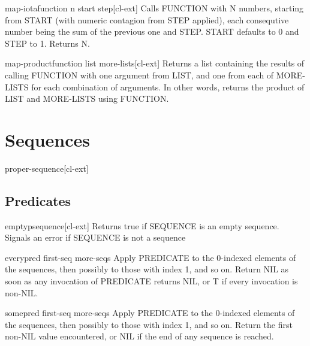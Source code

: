 \documentclass[10pt,english]{book}
\begin{document}
\begin{function}{map-iota}{function n \key start step}[cl-ext]
  Calls FUNCTION with N numbers, starting from START (with numeric contagion
from STEP applied), each consequtive number being the sum of the previous one
and STEP. START defaults to 0 and STEP to 1. Returns N.
\end{function}

\begin{function}{map-product}{function list \rest more-lists}[cl-ext]
  Returns a list containing the results of calling FUNCTION with one argument
from LIST, and one from each of MORE-LISTS for each combination of arguments.
In other words, returns the product of LIST and MORE-LISTS using FUNCTION.
\end{function}

\chapter{Sequences}
\label{cha:sequences}

\begin{type}{proper-sequence}{}[cl-ext]
  
\end{type}

\section{Predicates}
\label{sec:sequence-predicates}

\begin{function}{emptyp}{sequence}[cl-ext]
  Returns true if SEQUENCE is an empty sequence. Signals an error if
  SEQUENCE is not a sequence
\end{function}

\begin{function}{every}{pred first-seq \rest more-seqs}
  Apply PREDICATE to the 0-indexed elements of the sequences, then
  possibly to those with index 1, and so on. Return NIL as soon
  as any invocation of PREDICATE returns NIL, or T if every invocation
  is non-NIL.
\end{function}

\begin{function}{some}{pred first-seq \rest more-seqs}
  Apply PREDICATE to the 0-indexed elements of the sequences, then
  possibly to those with index 1, and so on. Return the first
  non-NIL value encountered, or NIL if the end of any sequence is reached.
\end{function}
\end{document}
